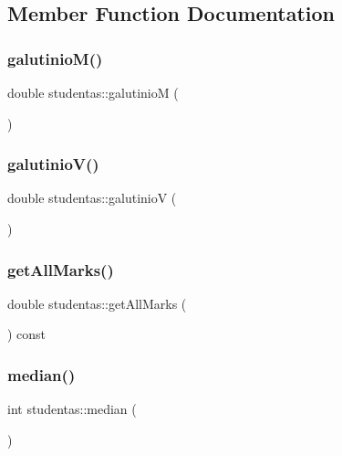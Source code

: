 \subsection{Member Function Documentation}
\mbox{\label{classstudentas_a8827137aded5c2a86cc3385125df4583}} 
\subsubsection{\texorpdfstring{galutinioM()}{galutinioM()}}
{\footnotesize\ttfamily double studentas\+::galutinioM (\begin{DoxyParamCaption}{ }\end{DoxyParamCaption})}

\mbox{\label{classstudentas_a1d69bccf536a7f5f15e3f347f70cc4c2}} 
\subsubsection{\texorpdfstring{galutinioV()}{galutinioV()}}
{\footnotesize\ttfamily double studentas\+::galutinioV (\begin{DoxyParamCaption}{ }\end{DoxyParamCaption})}

\mbox{\label{classstudentas_a8d73db48fa2c8dd1af53d22c2b8a8e6b}} 
\subsubsection{\texorpdfstring{getAllMarks()}{getAllMarks()}}
{\footnotesize\ttfamily double studentas\+::get\+All\+Marks (\begin{DoxyParamCaption}{ }\end{DoxyParamCaption}) const\hspace{0.3cm}{\ttfamily [inline]}}

\mbox{\label{classstudentas_a1b61aa2891c94971b67538447f2d1703}} 
\subsubsection{\texorpdfstring{median()}{median()}}
{\footnotesize\ttfamily int studentas\+::median (\begin{DoxyParamCaption}{ }\end{DoxyParamCaption})}


